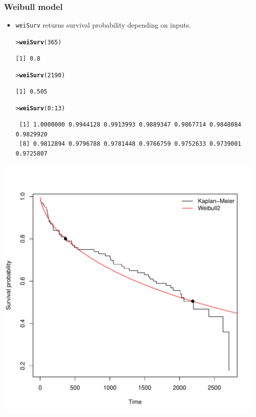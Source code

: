 \documentclass[10pt]{beamer}\usepackage[]{graphicx}\usepackage[]{color}
\makeatletter
\newcommand{\hlnum}[1]{\textcolor[rgb]{0.686,0.059,0.569}{#1}}%
\newcommand{\hlopt}[1]{\textcolor[rgb]{0,0,0}{#1}}%
\newcommand{\hlstd}[1]{\textcolor[rgb]{0.345,0.345,0.345}{#1}}%
\newcommand{\hlkwd}[1]{\textcolor[rgb]{0.737,0.353,0.396}{\textbf{#1}}}%
\newenvironment{kframe}{%
 \def\at@end@of@kframe{}%
 \ifinner\ifhmode%
  \def\at@end@of@kframe{\end{minipage}}%
  \begin{minipage}{\columnwidth}%
 \fi\fi%
 \def\FrameCommand##1{\hskip\@totalleftmargin \hskip-\fboxsep
 \colorbox{shadecolor}{##1}\hskip-\fboxsep
     \hskip-\linewidth \hskip-\@totalleftmargin \hskip\columnwidth}%
 \MakeFramed {\advance\hsize-\width
   \@totalleftmargin\z@ \linewidth\hsize
   \@setminipage}}%
 {\par\unskip\endMakeFramed%
 \at@end@of@kframe}
\newenvironment{knitrout}{}{} %
\renewenvironment{knitrout}{\setlength{\topsep}{-.2mm}}{}
\newcommand{\code}[1]{{\texttt{#1}}}
\makeatother
\begin{document}
\begin{frame}[fragile]
  \frametitle{Weibull model}
  \begin{itemize}
  \item \code{weiSurv} returns survival probability depending on inputs.
\begin{knitrout}\scriptsize
{}\color{fgcolor}\begin{kframe}
\begin{alltt}
\hlstd{> }\hlkwd{weiSurv}\hlstd{(}\hlnum{365}\hlstd{)}
\end{alltt}
\begin{verbatim}
[1] 0.8
\end{verbatim}
\begin{alltt}
\hlstd{> }\hlkwd{weiSurv}\hlstd{(}\hlnum{2190}\hlstd{)}
\end{alltt}
\begin{verbatim}
[1] 0.505
\end{verbatim}
\begin{alltt}
\hlstd{> }\hlkwd{weiSurv}\hlstd{(}\hlnum{0}\hlopt{:}\hlnum{13}\hlstd{)}
\end{alltt}
\begin{verbatim}
 [1] 1.0000000 0.9944128 0.9913993 0.9889347 0.9867714 0.9848084 0.9829920
 [8] 0.9812894 0.9796788 0.9781448 0.9766759 0.9752633 0.9739001 0.9725807
\end{verbatim}
\end{kframe}
\end{knitrout}
  \end{itemize}\vspace{-.75cm}
  \begin{center}
    \includegraphics[scale = .32]{Weibull2}
  \end{center}
\end{frame}
\end{document}
